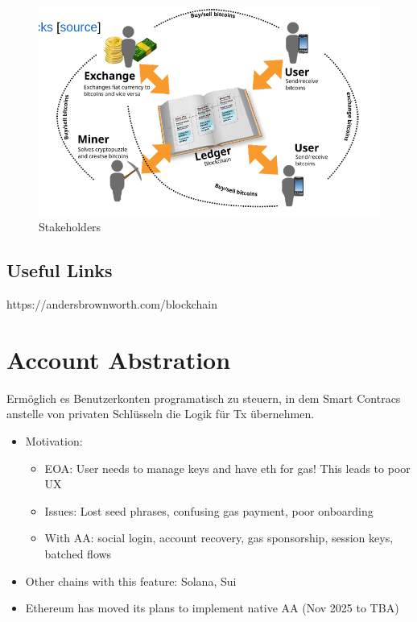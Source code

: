 \documentclass[../Main.tex]{subfiles}
\begin{document}
\begin{figure}[H]
    \centering
    \includegraphics[width=0.75\linewidth]{Images/blockchain/bitcoin-stakeholders.png}
    \caption{Stakeholders}
\end{figure}

\subsection{Useful Links}
https://andersbrownworth.com/blockchain

\section{Account Abstration}
Ermöglich es Benutzerkonten programatisch zu steuern,
in dem Smart Contracs anstelle von privaten Schlüsseln die Logik für Tx übernehmen.

\begin{itemize}
    \item Motivation:
          \begin{itemize}
              \item EOA: User needs to manage keys and have eth for gas! This leads to poor UX
              \item Issues: Lost seed phrases, confusing gas payment, poor onboarding
              \item With AA: social login, account recovery, gas sponsorship, session keys, batched flows
          \end{itemize}
    \item Other chains with this feature: Solana, Sui
    \item Ethereum has moved its plans to implement native AA (Nov 2025 to TBA)
\end{itemize}
\end{document}
